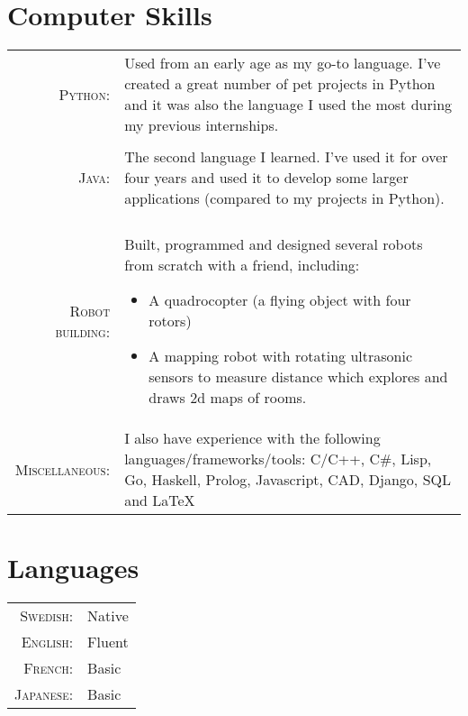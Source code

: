 \documentclass[a4paper,10pt]{article} %
\begin{document}

\section{Computer Skills}

\begin{tabular}{rp{12cm}}

\textsc{Python:} & \small{Used from an early age as my go-to language. I’ve created a great number of pet projects in Python and it was also the language I used the most during my previous internships.}\\\\

\textsc{Java:} & \small{The second language I learned. I’ve used it for over four years and used it to develop some larger applications (compared to my projects in Python).}\\\\

\textsc{Robot building:} & \small{Built, programmed and designed several robots from scratch with a friend, including:
\begin{itemize}
\item A quadrocopter (a flying object with four rotors)
\item A mapping robot with rotating ultrasonic sensors to measure distance which explores and draws 2d maps of rooms.
\end{itemize}}\\

\textsc{Miscellaneous:} & \small{I also have experience with the following languages/frameworks/tools:  C/C++, C\#, Lisp, Go, Haskell, Prolog, Javascript, CAD, Django, SQL and \LaTeX}

\end{tabular}


\section{Languages}

\begin{tabular}{rl}
\textsc{Swedish:} & Native\\

\textsc{English:} & Fluent\\

\textsc{French:} & Basic\\

\textsc{Japanese:} & Basic\\
\end{tabular}
\end{document}
